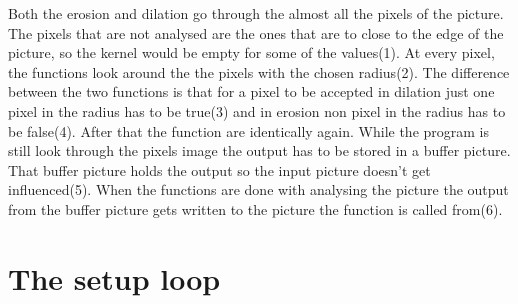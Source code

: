Both the erosion and dilation go through the almost all the pixels of the picture. The pixels that are not analysed are the ones that are to close to the edge of the picture, so the kernel would be empty for some of the values(1). At every pixel, the functions look around the the pixels with the chosen radius(2). The difference between the two functions is that for a pixel to be accepted in  dilation just one pixel in the radius has to be true(3) and in erosion non pixel in the radius has to be false(4). After that the function are identically again. While the program is still look through the pixels image the output has to be stored in a buffer picture. That buffer picture holds the output so the input picture doesn't get influenced(5). When the functions are done with analysing the picture the output from the buffer picture gets written to the picture the function is called from(6). 

\section{The setup loop}
